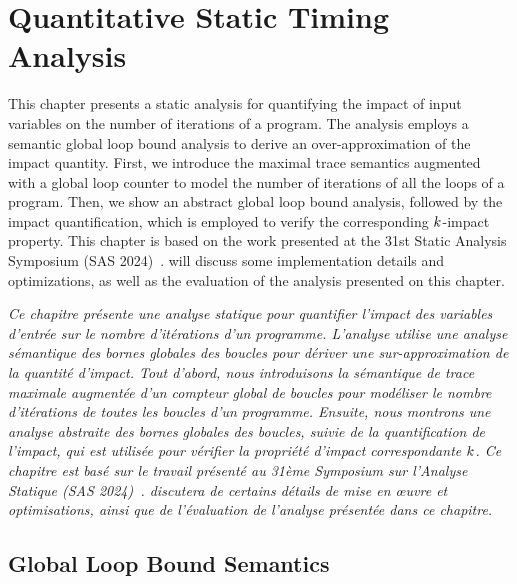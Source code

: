 
\setchapterpreamble[u]{\margintoc}

\chapter{Quantitative Static Timing Analysis}

This chapter presents a static analysis for quantifying the impact of input variables on the number of iterations of a program.
The analysis employs a semantic global loop bound analysis to derive an over-approximation of the impact quantity.
First, we introduce the maximal trace semantics augmented with a global loop counter to model the number of iterations of all the loops of a program.
Then, we show an abstract global loop bound analysis, followed by the impact quantification, which is employed to verify the corresponding $k$-impact property.
This chapter is based on the work presented at the 31st Static Analysis Symposium (SAS 2024)~\cite{Mazzucato2024c}.
 will discuss some implementation details and optimizations, as well as the evaluation of the analysis presented on this chapter.


\frenchdiv

\emph{Ce chapitre présente une analyse statique pour quantifier l'impact des variables d'entrée sur le nombre d'itérations d'un programme. L'analyse utilise une analyse sémantique des bornes globales des boucles pour dériver une sur-approximation de la quantité d'impact. Tout d'abord, nous introduisons la sémantique de trace maximale augmentée d'un compteur global de boucles pour modéliser le nombre d'itérations de toutes les boucles d'un programme. Ensuite, nous montrons une analyse abstraite des bornes globales des boucles, suivie de la quantification de l'impact, qui est utilisée pour vérifier la propriété d'impact correspondante $k$. Ce chapitre est basé sur le travail présenté au 31ème Symposium sur l'Analyse Statique (SAS 2024)~.  discutera de certains détails de mise en œuvre et optimisations, ainsi que de l'évaluation de l'analyse présentée dans ce chapitre.}



\section{Global Loop Bound Semantics}


